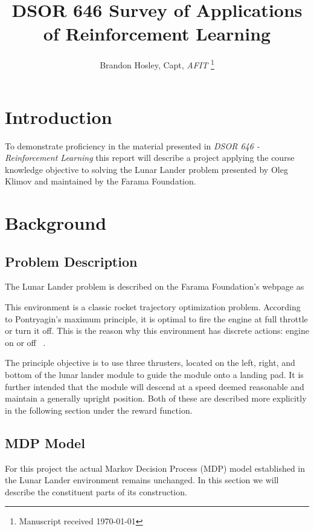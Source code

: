 \documentclass[journal]{IEEEtran}
\title{DSOR 646 Survey of Applications of Reinforcement Learning}
\author{Brandon Hosley, Capt, \textit{AFIT}%
    \thanks{Manuscript received \today%
}}
\begin{document}
\maketitle

\begin{abstract}

\end{abstract}

\section{Introduction}
\label{sec:introduction}

To demonstrate proficiency in the material presented in \emph{DSOR 646 - Reinforcement Learning}
this report will describe a project applying the course knowledge objective to solving
the Lunar Lander problem presented by Oleg Klimov and maintained by the Farama Foundation.

\section{Background}

\subsection{Problem Description}

The Lunar Lander problem is described on the Farama Foundation's webpage as
\begin{displayquote}
    This environment is a classic rocket trajectory optimization problem. According to Pontryagin's 
    maximum principle, it is optimal to fire the engine at full throttle or turn it off. 
    This is the reason why this environment has discrete actions: engine on or off
    ~\cite{farama}.
\end{displayquote}
The principle objective is to use three thrusters, located on the left, right, and bottom of the
lunar lander module to guide the module onto a landing pad.
It is further intended that the module will descend at a speed deemed reasonable
and maintain a generally upright position.
Both of these are described more explicitly in the following section under the reward function.

\subsection{MDP Model}
\label{sec:MDP Model}

For this project the actual Markov Decision Process (MDP) model established in the Lunar Lander
environment remains unchanged. In this section we will describe the constituent parts of its 
construction.
\end{document}
